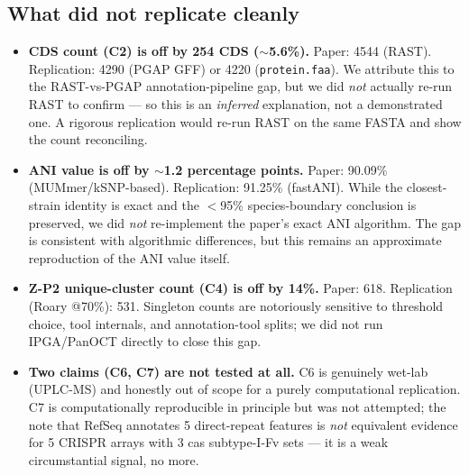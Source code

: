\documentclass[11pt]{article}
\begin{document}
\subsection*{What did not replicate cleanly}
\begin{itemize}[leftmargin=*]
  \item \textbf{CDS count (C2) is off by 254 CDS ($\sim$5.6\%).} Paper: 4544 (RAST). Replication: 4290 (PGAP GFF) or 4220 (\texttt{protein.faa}). We attribute this to the RAST-vs-PGAP annotation-pipeline gap, but we did \emph{not} actually re-run RAST to confirm --- so this is an \emph{inferred} explanation, not a demonstrated one. A rigorous replication would re-run RAST on the same FASTA and show the count reconciling.
  \item \textbf{ANI value is off by $\sim$1.2 percentage points.} Paper: 90.09\% (MUMmer/kSNP-based). Replication: 91.25\% (fastANI). While the closest-strain identity is exact and the $<$95\% species-boundary conclusion is preserved, we did \emph{not} re-implement the paper's exact ANI algorithm. The gap is consistent with algorithmic differences, but this remains an approximate reproduction of the ANI value itself.
  \item \textbf{Z-P2 unique-cluster count (C4) is off by 14\%.} Paper: 618. Replication (Roary @70\%): 531. Singleton counts are notoriously sensitive to threshold choice, tool internals, and annotation-tool splits; we did not run IPGA/PanOCT directly to close this gap.
  \item \textbf{Two claims (C6, C7) are not tested at all.} C6 is genuinely wet-lab (UPLC-MS) and honestly out of scope for a purely computational replication. C7 is computationally reproducible in principle but was not attempted; the note that RefSeq annotates 5 direct-repeat features is \emph{not} equivalent evidence for 5 CRISPR arrays with 3 cas subtype-I-Fv sets --- it is a weak circumstantial signal, no more.
\end{itemize}
\end{document}
